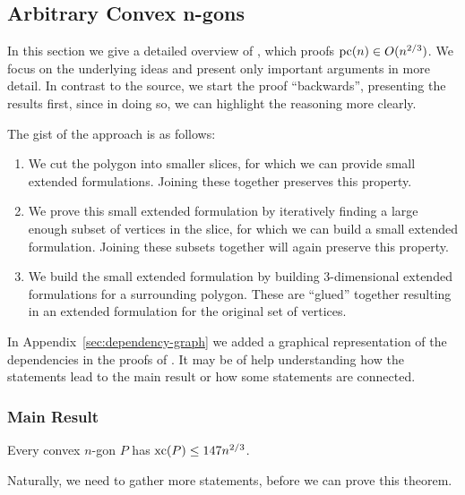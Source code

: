 \subsection{Arbitrary Convex n-gons}

In this section we give a detailed overview of \cite{shitov2020sublinear}, which proofs $\operatorname{pc}(n) \in O(n^{2/3})$. 
We focus on the underlying ideas and present only important arguments in more detail. In contrast to the source, we start the proof ``backwards'', presenting  the results first, since in doing so, we can highlight the reasoning more clearly.

The gist of the approach is as follows: 
\begin{enumerate}
  \item We cut the polygon into smaller slices, for which we can provide small extended formulations. Joining these together preserves this property.
  \item We prove this small extended formulation by iteratively finding a large enough subset of vertices in the slice, for which we can build a small extended formulation. Joining these subsets together will again preserve this property.
  \item We build the small extended formulation by building 3-dimensional extended formulations for a surrounding polygon. These are ``glued'' together resulting in an extended formulation for the original set of vertices.
\end{enumerate}

In Appendix~\ref{sec:dependency-graph} we added a graphical representation of the dependencies in the proofs of \cite{shitov2014sublinear}. It may be of help understanding how the statements lead to the main result or how some statements are connected.



\subsubsection{Main Result}

\begin{theorem}\label{theorem:xc}
  Every convex $n$-gon $P$ has $\operatorname{xc}(P) \leq 147 n^{2/3}$.
\end{theorem}

Naturally, we need to gather more statements, before we can prove this theorem. 

